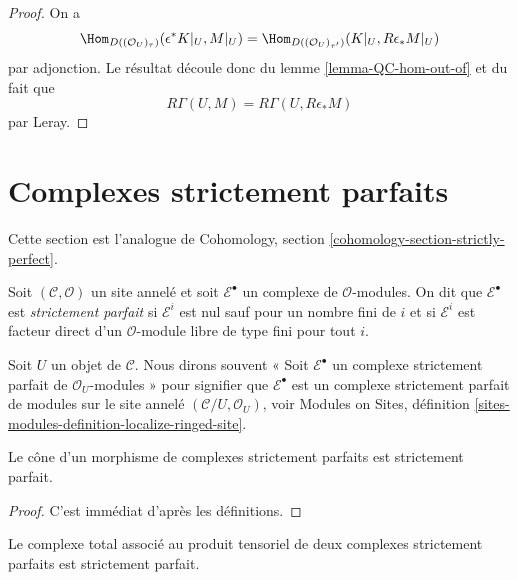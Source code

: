 \begin{proof}
On a
$$
\Hom_{D((\mathcal{O}_U)_\tau)}(\epsilon^*K|_U, M|_U) =
\Hom_{D((\mathcal{O}_U)_{\tau'})}(K|_U, R\epsilon_*M|_U)
$$
par adjonction. Le résultat découle donc du lemme
\ref{lemma-QC-hom-out-of} et du fait que
$$
R\Gamma(U, M) = R\Gamma(U, R\epsilon_*M)
$$
par Leray.
\end{proof}







\section{Complexes strictement parfaits}
\label{section-strictly-perfect}

\noindent
Cette section est l'analogue de Cohomology, section
\ref{cohomology-section-strictly-perfect}.

\begin{definition}
\label{definition-strictly-perfect}
Soit $(\mathcal{C}, \mathcal{O})$ un site annelé et soit
$\mathcal{E}^\bullet$ un complexe de $\mathcal{O}$-modules. On dit que
$\mathcal{E}^\bullet$ est {\it strictement parfait} si
$\mathcal{E}^i$ est nul sauf pour un nombre fini de $i$ et si
$\mathcal{E}^i$ est facteur direct d'un $\mathcal{O}$-module libre de type fini
pour tout $i$.
\end{definition}

\noindent
Soit $U$ un objet de $\mathcal{C}$. Nous dirons souvent « Soit
$\mathcal{E}^\bullet$ un complexe strictement parfait de
$\mathcal{O}_U$-modules » pour signifier que $\mathcal{E}^\bullet$ est un
complexe strictement parfait de modules sur le site annelé
$(\mathcal{C}/U, \mathcal{O}_U)$, voir Modules on Sites, définition
\ref{sites-modules-definition-localize-ringed-site}.

\begin{lemma}
\label{lemma-cone}
Le cône d'un morphisme de complexes strictement parfaits est strictement
parfait.
\end{lemma}

\begin{proof}
C'est immédiat d'après les définitions.
\end{proof}

\begin{lemma}
\label{lemma-tensor}
Le complexe total associé au produit tensoriel de deux complexes strictement
parfaits est strictement parfait.
\end{lemma}

